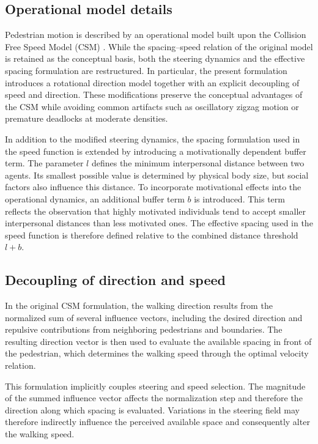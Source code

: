 \documentclass[pdflatex,sn-mathphys-num]{sn-jnl}%
\theoremstyle{thmstyleone}%
\theoremstyle{thmstyletwo}%
\theoremstyle{thmstylethree}%
\begin{document}
\begin{appendices}

\section{Operational model details}\label{app:operational-model}

Pedestrian motion is described by an operational model built upon the
Collision Free Speed Model (CSM) \cite{Tordeux2016a}. While the
spacing--speed relation of the original model is retained as the conceptual
basis, both the steering dynamics and the effective spacing formulation are
restructured. In particular, the present formulation introduces a rotational
direction model together with an explicit decoupling of speed and direction.
These modifications preserve the conceptual advantages of the CSM while
avoiding common artifacts such as oscillatory zigzag motion or premature
deadlocks at moderate densities.

In addition to the modified steering dynamics, the spacing formulation used
in the speed function is extended by introducing a motivationally dependent
buffer term. The parameter $l$ defines the minimum interpersonal distance
between two agents. Its smallest possible value is determined by physical
body size, but social factors also influence this distance. To incorporate
motivational effects into the operational dynamics, an additional buffer
term $b$ is introduced. This term reflects the observation that highly
motivated individuals tend to accept smaller interpersonal distances than
less motivated ones. The effective spacing used in the speed function is
therefore defined relative to the combined distance threshold $l + b$.

\subsection{Decoupling of direction and speed}

In the original CSM formulation, the walking direction results from the
normalized sum of several influence vectors, including the desired
direction and repulsive contributions from neighboring pedestrians and
boundaries. The resulting direction vector is then used to evaluate the
available spacing in front of the pedestrian, which determines the walking
speed through the optimal velocity relation.

This formulation implicitly couples steering and speed selection. The
magnitude of the summed influence vector affects the normalization step and
therefore the direction along which spacing is evaluated. Variations in the
steering field may therefore indirectly influence the perceived available
space and consequently alter the walking speed.


\end{appendices}
\end{document}
